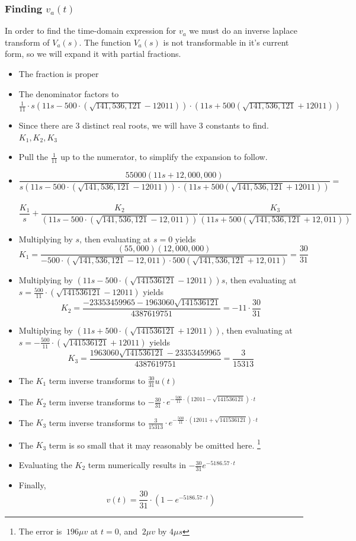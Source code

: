 \documentclass[11pt]{article}
\begin{document}
	\subsubsection*{Finding $v_a(t)$}
	In order to find the time-domain expression for $v_a$ we must do an inverse laplace transform of $V_a(s)$. The function $V_a(s)$ is not transformable in it's current form, so we will expand it with partial fractions.
	\begin{itemize}
		\item The fraction is proper
		\item The denominator factors to $\frac{1}{11}\cdot s(11s-500\cdot (\sqrt{141,536,121}-12011))\cdot (11s+500(\sqrt{141,536,121}+12011))$
		\item Since there are 3 distinct real roots, we will have 3 constants to find. $K_1,K_2,K_3$
		\item Pull the $\frac{1}{11}$ up to the numerator, to simplify the expansion to follow.
		\item \[ \frac{55000(11s+12,000,000)}{s(11s-500\cdot (\sqrt{141,536,121}-12011))\cdot (11s+500(\sqrt{141,536,121}+12011))} =\] \\ \[ \frac{K_1}{s} + \frac{K_2}{(11s-500\cdot (\sqrt{141,536,121}-12,011))} \frac{K_3}{(11s+500(\sqrt{141,536,121}+12,011))}\]
		
		\item Multiplying by $s$, then evaluating at $s=0$ yields \[K_1=\frac{(55,000)(12,000,000)}{-500\cdot (\sqrt{141,536,121}-12,011)\cdot 500(\sqrt{141,536,121}+12,011)} = \frac{30}{31}\]
		
		\item Multiplying by $(11s-500\cdot (\sqrt{141536121}-12011))s$, then evaluating at $s=\frac{500}{11}\cdot (\sqrt{141536121}-12011) $ yields \[K_2 = \frac{-23353459965-1963060 \sqrt{141536121}}{4387619751} = -11\cdot\frac{30}{31} \]
		
		\item Multiplying by $(11s+500\cdot (\sqrt{141536121}+12011))$, then evaluating at $s=-\frac{500}{11}\cdot (\sqrt{141536121}+12011)$ yields \[K_3 = \frac{1963060 \sqrt{141536121}-23353459965}{4387619751} = \frac{3}{15313}\]
		
		\item The $K_1$ term inverse transforms to $\frac{30}{31}u(t)$
		\item The $K_2$ term inverse transforms to $-\frac{30}{31}\cdot e^{-\frac{500}{11}\cdot (12011-\sqrt{141536121})\cdot t}$
		\item The $K_3$ term inverse transforms to $\frac{3}{15313}\cdot e^{-\frac{500}{11}\cdot (12011+\sqrt{141536121})\cdot t}$
		
		\item The $K_3$ term is so small that it may reasonably be omitted here. \footnote{The error is $~196\mu v$ at $t=0$, and $~2\mu v$ by $4\mu s$}
		\item Evaluating the $K_2$ term numerically results in $-\frac{30}{31}e^{-5186.57\cdot t}$
		\item Finally, \[ v(t) = \frac{30}{31}\cdot(1-e^{-5186.57\cdot t}) \]
	\end{itemize}
	
\end{document}
